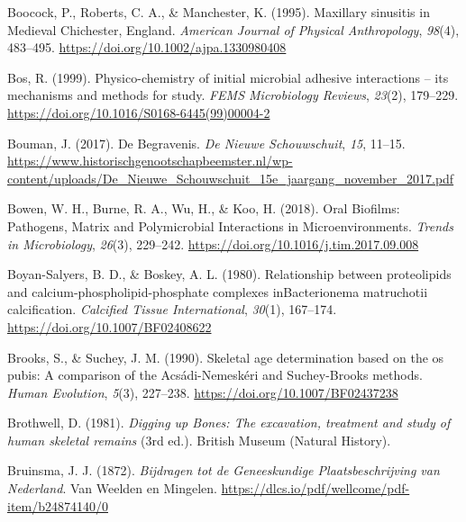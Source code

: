 \documentclass[
  letterpaper,
]{book}
\newlength{\cslhangindent}
\newlength{\cslentryspacingunit} %
\newenvironment{CSLReferences}[2] %
 {%
  \setlength{\parindent}{0pt}
  \ifodd #1
  \let\oldpar\par
  \def\par{\hangindent=\cslhangindent\oldpar}
  \fi
  \setlength{\parskip}{#2\cslentryspacingunit}
 }%
 {}
\begin{document}
\begin{CSLReferences}{1}{0}
\leavevmode{}%
Boocock, P., Roberts, C. A., \& Manchester, K. (1995). Maxillary
sinusitis in {Medieval Chichester}, {England}. \emph{American Journal of
Physical Anthropology}, \emph{98}(4), 483--495.
\url{https://doi.org/10.1002/ajpa.1330980408}

\leavevmode{}%
Bos, R. (1999). Physico-chemistry of initial microbial adhesive
interactions -- its mechanisms and methods for study. \emph{FEMS
Microbiology Reviews}, \emph{23}(2), 179--229.
\url{https://doi.org/10.1016/S0168-6445(99)00004-2}

\leavevmode{}%
Bouman, J. (2017). De Begravenis. \emph{De Nieuwe Schouwschuit},
\emph{15}, 11--15.
\url{https://www.historischgenootschapbeemster.nl/wp-content/uploads/De_Nieuwe_Schouwschuit_15e_jaargang_november_2017.pdf}

\leavevmode{}%
Bowen, W. H., Burne, R. A., Wu, H., \& Koo, H. (2018). Oral {Biofilms}:
{Pathogens}, {Matrix} and {Polymicrobial Interactions} in
{Microenvironments}. \emph{Trends in Microbiology}, \emph{26}(3),
229--242. \url{https://doi.org/10.1016/j.tim.2017.09.008}

\leavevmode{}%
Boyan-Salyers, B. D., \& Boskey, A. L. (1980). Relationship between
proteolipids and calcium-phospholipid-phosphate complexes
{inBacterionema} matruchotii calcification. \emph{Calcified Tissue
International}, \emph{30}(1), 167--174.
\url{https://doi.org/10.1007/BF02408622}

\leavevmode{}%
Brooks, S., \& Suchey, J. M. (1990). Skeletal age determination based on
the os pubis: {A} comparison of the {Acsádi-Nemeskéri} and
{Suchey-Brooks} methods. \emph{Human Evolution}, \emph{5}(3), 227--238.
\url{https://doi.org/10.1007/BF02437238}

\leavevmode{}%
Brothwell, D. (1981). \emph{Digging up {Bones}: {The} excavation,
treatment and study of human skeletal remains} (3rd ed.). {British
Museum (Natural History)}.

\leavevmode{}%
Bruinsma, J. J. (1872). \emph{Bijdragen tot de {Geneeskundige
Plaatsbeschrijving} van {Nederland}}. {Van Weelden en Mingelen}.
\url{https://dlcs.io/pdf/wellcome/pdf-item/b24874140/0}


\end{CSLReferences}
\end{document}

